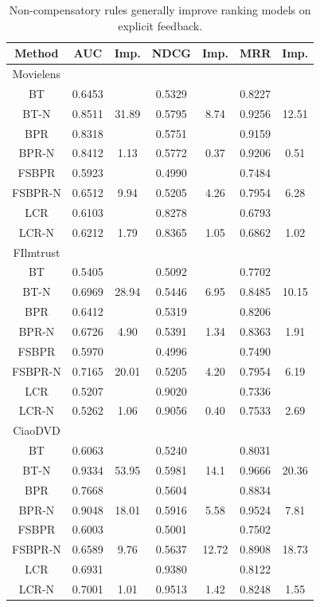 \documentclass[letterpaper]{article} %
\begin{document}
\begin{table}[htp]
\caption{Non-compensatory rules generally improve ranking models on explicit feedback.}
\scriptsize
\begin{center}
\begin{tabular}{c cc |cc |cc}
\hline
 Method & AUC & Imp.& NDCG& Imp.& MRR &Imp. \\\hline
Movielens\\\hline
BT& 0.6453 & & 0.5329 & & 0.8227 & \\
BT-N& 0.8511 & 31.89& 0.5795 & 8.74& 0.9256 & 12.51\\
BPR& 0.8318 & & 0.5751 & & 0.9159 & \\
BPR-N& 0.8412 & 1.13& 0.5772 & 0.37& 0.9206 & 0.51\\
FSBPR &0.5923& &0.4990 && 0.7484&\\ 
FSBPR-N &0.6512 &9.94 & 0.5205 &4.26 &0.7954 &6.28 \\
LCR &0.6103& &0.8278 && 0.6793&\\ 
LCR-N &0.6212 &1.79 & 0.8365 &1.05 &0.6862 &1.02 \\
\hline
FIlmtrust\\\hline
BT& 0.5405 & & 0.5092 & & 0.7702 & \\
BT-N & 0.6969 & 28.94& 0.5446 & 6.95& 0.8485 & 10.15\\
BPR& 0.6412 & & 0.5319 & & 0.8206 & \\
BPR-N& 0.6726 & 4.90& 0.5391 & 1.34& 0.8363 & 1.91\\
FSBPR &0.5970& &0.4996 && 0.7490&\\ 
FSBPR-N &0.7165 &20.01 & 0.5205 &4.20 &0.7954 &6.19 \\
LCR &0.5207& &0.9020 && 0.7336&\\ 
LCR-N &0.5262 &1.06 & 0.9056 &0.40 &0.7533 &2.69 \\
\hline
CiaoDVD\\\hline
BT& 0.6063 & & 0.5240 & & 0.8031 & \\
BT-N& 0.9334 & 53.95& 0.5981 & 14.1& 0.9666 & 20.36\\
BPR& 0.7668 & & 0.5604 & & 0.8834 & \\
BPR-N& 0.9048 & 18.01& 0.5916 & 5.58& 0.9524 & 7.81\\
FSBPR &0.6003& &0.5001 && 0.7502&\\ 
FSBPR-N &0.6589 &9.76 & 0.5637 &12.72 &0.8908 &18.73 \\
LCR &0.6931& &0.9380 && 0.8122&\\ 
LCR-N &0.7001 &1.01 & 0.9513 &1.42 &0.8248 &1.55 \\
\hline
\end{tabular}
\end{center}
\label{tab:rankingresult}
\end{table}
\end{document}
